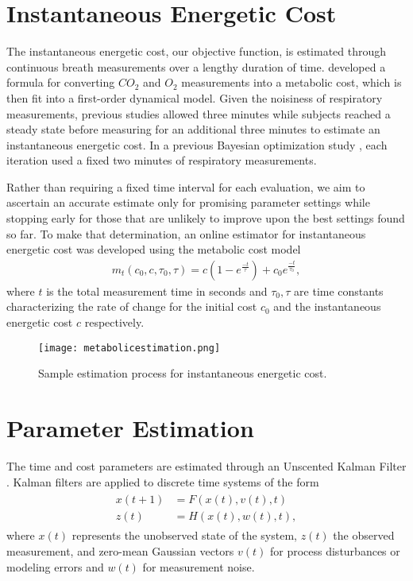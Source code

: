 \section{Instantaneous Energetic Cost}
The instantaneous energetic cost, our objective function, is estimated through continuous breath measurements over a lengthy duration of time. \citet{Brockway1987} developed a formula for converting $CO_2$ and $O_2$ measurements into a metabolic cost, which is then fit into a first-order dynamical model. Given the noisiness of respiratory measurements, previous studies \citep{Felt2015,Selinger2014} allowed three minutes while subjects reached a steady state before measuring for an additional three minutes to estimate an instantaneous energetic cost. In a previous Bayesian optimization study \citep{Ding2018}, each iteration used a fixed two minutes of respiratory measurements. 

Rather than requiring a fixed time interval for each evaluation, we aim to ascertain an accurate estimate only for promising parameter settings while stopping early for those that are unlikely to improve upon the best settings found so far. To make that determination, an online estimator for instantaneous energetic cost was developed using the metabolic cost model
\begin{align}
m_t(c_0, c, \tau_0, \tau) = c(1-e^{\frac{-t}{\tau}}) + c_0e^{\frac{-t}{\tau_0}},
\end{align}
where $t$ is the total measurement time in seconds and $\tau_0, \tau$ are time constants characterizing the rate of change for the initial cost $c_0$ and the instantaneous energetic cost $c$ respectively.

\begin{figure}[t]
\centering
\texttt{[image: metabolicestimation.png]}
\caption{Sample estimation process for instantaneous energetic cost.}
\label{fig:metabolicestimation}
\end{figure}

\section{Parameter Estimation}
The time and cost parameters are estimated through an Unscented Kalman Filter \citep{julier1997}. Kalman filters are applied to discrete time systems of the form
\begin{align}\begin{split}
  x(t+1) &= F(x(t), v(t), t)\\
  z(t) &= H(x(t), w(t), t),
\end{split}\end{align}
where $x(t)$ represents the unobserved state of the system, $z(t)$ the observed measurement, and zero-mean Gaussian vectors $v(t)$ for process disturbances or modeling errors and $w(t)$ for measurement noise. 

